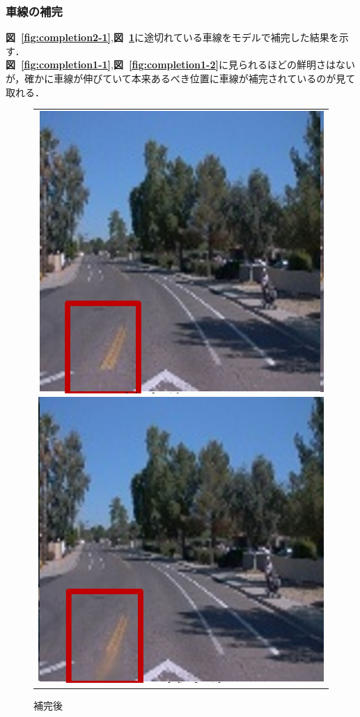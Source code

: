 \documentclass[a4j, 11pt]{jreport}
\newcommand{\figref}[1]{\textbf{図~\ref{#1}}}
\begin{document}
\subsubsection{車線の補完}
\figref{fig:completion2-1},\figref{fig:completion2-2}に途切れている車線をモデルで補完した結果を示す．\\
\figref{fig:completion1-1},\figref{fig:completion1-2}に見られるほどの鮮明さはないが，確かに車線が伸びていて本来あるべき位置に車線が補完されているのが見て取れる．
\begin{figure}[H]
	\centering
	  \begin{tabular}{c}
		\begin{minipage}{0.50\hsize}
		  \centering
			\includegraphics[scale=0.5]
			{images/result/completion/result2-1.png}
			\caption{補完前}
			\label{fig:completion2-1}
		\end{minipage}
   
   
		\begin{minipage}{0.50\hsize}
		  \centering
			\includegraphics[scale=0.5]
			{images/result/completion/result2-2.png}
			\caption{補完後}
			\label{fig:completion2-2}
		\end{minipage} \\
	\end{tabular}
\end{figure}
\end{document}
